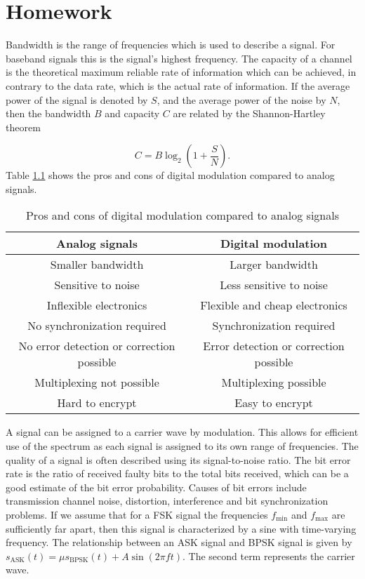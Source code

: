 \documentclass[11pt,titlepage]{report}
\begin{document}
\chapter{Homework}
Bandwidth is the range of frequencies which is used to describe a signal. For baseband signals this is the signal's highest frequency. The capacity of a channel is the  theoretical maximum reliable rate of information which can be achieved, in contrary to the data rate, which is the actual rate of information. If the average power of the signal is denoted by $S$, and the average power of the noise by $N$, then the bandwidth $B$ and capacity $C$ are related by the Shannon-Hartley theorem

\begin{equation}
	C=B \log_2{\left(1+\frac{S}{N}\right)}.
\end{equation}
Table \ref{tab:pros-cons} shows the pros and cons of digital modulation compared to analog signals.

\begin{table}[H]
	\centering
	\caption{Pros and cons of digital modulation compared to analog signals}
	\label{tab:pros-cons}
	\begin{tabular}{c c}
		\hline\hline
		Analog signals & Digital modulation \\
		\hline
		Smaller bandwidth & Larger bandwidth \\
		Sensitive to noise & Less sensitive to noise \\
		Inflexible electronics & Flexible and cheap electronics \\
		No synchronization required & Synchronization required \\
		No error detection or correction possible & Error detection or correction possible \\
		Multiplexing not possible & Multiplexing possible \\
		Hard to encrypt & Easy to encrypt \\
		\hline
	\end{tabular}
\end{table}

A signal can be assigned to a carrier wave by modulation. This allows for efficient use of the spectrum as each signal is assigned to its own range of frequencies. The quality of a signal is often described using its signal-to-noise ratio. The bit error rate is the ratio of received faulty bits to the total bits received, which can be a good estimate of the bit error probability. Causes of bit errors include transmission channel noise, distortion, interference and bit synchronization problems. If we assume that for a FSK signal the frequencies $f_{\text{min}}$ and $f_{\text{max}}$ are sufficiently far apart, then this signal is characterized by a sine with time-varying frequency. The relationship between an ASK signal and BPSK signal is given by $s_{\text{ASK}}(t) = \mu s_{\text{BPSK}}(t) + A \sin{(2 \pi f t)}$. The second term represents the carrier wave.
\end{document}
